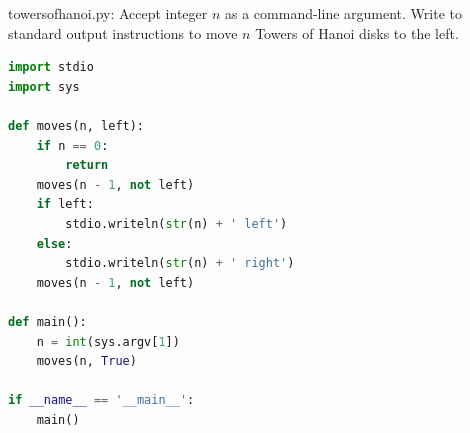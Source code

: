 \documentclass[8pt,a4paper,compress]{beamer}
\begin{document}
\begin{frame}[fragile]
\pause

\begin{framed}
\tiny towersofhanoi.py: Accept integer $n$ as a command-line argument. Write to standard output instructions to move $n$ Towers of Hanoi disks to the left.
\end{framed}

\begin{minipage}{200pt}
\begin{lstlisting}[language=Python]
import stdio
import sys

def moves(n, left):
    if n == 0:
        return
    moves(n - 1, not left)
    if left:
        stdio.writeln(str(n) + ' left')
    else:
        stdio.writeln(str(n) + ' right')
    moves(n - 1, not left)

def main():
    n = int(sys.argv[1])
    moves(n, True)

if __name__ == '__main__':
    main()
\end{lstlisting}

\pause


\end{minipage}
\end{frame}
\end{document}
